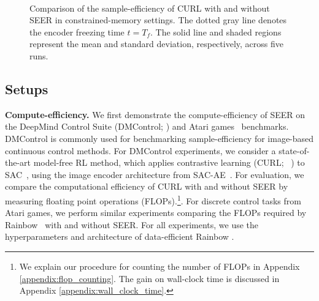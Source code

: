 \documentclass{article}
\begin{document}
\begin{figure*} [t] \centering
{} 
\\
\caption{Comparison of the sample-efficiency of CURL with and without SEER in constrained-memory settings. The dotted gray line denotes the encoder freezing time $t=T_f$. The solid line and shaded regions represent the mean and standard deviation, respectively, across five runs.} \label{fig:memory_dmc}
\vspace{-0.1in}
\end{figure*}

\subsection{Setups} \label{setups}

\textbf{Compute-efficiency.} 
We first demonstrate the compute-efficiency of SEER on the DeepMind Control Suite (DMControl; \citealt{tassa2018deepmind}) and Atari games~\citep{bellemare2013arcade} benchmarks.
DMControl is commonly used for benchmarking sample-efficiency for image-based continuous control methods.
For DMControl experiments,
we consider a state-of-the-art model-free RL method, which applies contrastive learning (CURL; ~\citealt{srinivas2020curl}) to SAC~\citep{haarnoja2018soft}, using the image encoder architecture from
SAC-AE~\citep{yarats2019improving}.
For evaluation,
we compare the computational efficiency of CURL with and without SEER by measuring floating point operations (FLOPs).\footnote{
We explain our procedure for counting the number of FLOPs in Appendix \ref{appendix:flop_counting}. 
The gain on wall-clock time is discussed in Appendix \ref{appendix:wall_clock_time}.}.
For discrete control tasks from Atari games,
we perform similar experiments comparing the FLOPs required by Rainbow~\citep{hessel2018rainbow} with and without SEER. For all experiments, we use the hyperparameters and architecture of data-efficient Rainbow \citep{van2019use}. 
\end{document}
